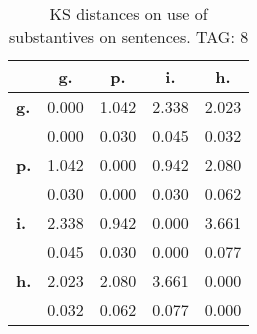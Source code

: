 \begin{table}[h!]
\begin{center}
\begin{tabular}{| l || c | c | c | c |}\hline
 & {\bf g.} & {\bf p.} & {\bf i.} & {\bf h.} \\\hline\hline
{\bf g.} & 0.000 & 1.042 & 2.338 & 2.023 \\
{\bf } & 0.000 & 0.030 & 0.045 & 0.032 \\\hline
{\bf p.} & 1.042 & 0.000 & 0.942 & 2.080 \\
{\bf } & 0.030 & 0.000 & 0.030 & 0.062 \\\hline
{\bf i.} & 2.338 & 0.942 & 0.000 & 3.661 \\
{\bf } & 0.045 & 0.030 & 0.000 & 0.077 \\\hline
{\bf h.} & 2.023 & 2.080 & 3.661 & 0.000 \\
{\bf } & 0.032 & 0.062 & 0.077 & 0.000 \\\hline
\end{tabular}
\caption{KS distances on use of substantives on sentences. TAG: 8}
\end{center}
\end{table}